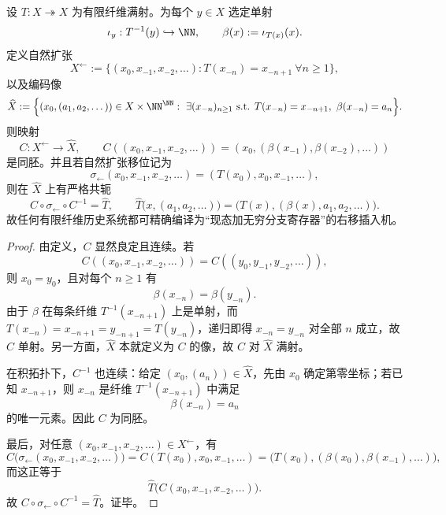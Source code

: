 \begin{theorem}[有限纤维自然扩张的右移插入实现]\label{thm:conclusion-finite-fiber-natural-extension-right-shift-insertion}
设 \(T:X\twoheadrightarrow X\) 为有限纤维满射。为每个 \(y\in X\) 选定单射
\[
\iota_y:T^{-1}(y)\hookrightarrow \NN,
\qquad
\beta(x):=\iota_{T(x)}(x).
\]
定义自然扩张
\[
X^{\leftarrow}
:=
\{(x_0,x_{-1},x_{-2},\dots): T(x_{-n})=x_{-n+1}\ \forall n\ge 1\},
\]
以及编码像
\[
\widehat X
:=
\Bigl\{(x_0,(a_1,a_2,\dots))\in X\times \NN^{\NN}:\ \exists (x_{-n})_{n\ge 1}
\text{ s.t. }T(x_{-n})=x_{-n+1},\ \beta(x_{-n})=a_n\Bigr\}.
\]
则映射
\[
C:X^{\leftarrow}\to \widehat X,
\qquad
C((x_0,x_{-1},x_{-2},\dots))=(x_0,(\beta(x_{-1}),\beta(x_{-2}),\dots))
\]
是同胚。并且若自然扩张移位记为
\[
\sigma_{\leftarrow}(x_0,x_{-1},x_{-2},\dots)=(T(x_0),x_0,x_{-1},\dots),
\]
则在 \(\widehat X\) 上有严格共轭
\[
C\circ \sigma_{\leftarrow}\circ C^{-1}
=
\widehat T,
\qquad
\widehat T\bigl(x,(a_1,a_2,\dots)\bigr)=\bigl(T(x),(\beta(x),a_1,a_2,\dots)\bigr).
\]
故任何有限纤维历史系统都可精确编译为“现态加无穷分支寄存器”的右移插入机。
\end{theorem}
\begin{proof}
由定义，\(C\) 显然良定且连续。若
\[
C((x_0,x_{-1},x_{-2},\dots))=C((y_0,y_{-1},y_{-2},\dots)),
\]
则 \(x_0=y_0\)，且对每个 \(n\ge 1\) 有
\[
\beta(x_{-n})=\beta(y_{-n}).
\]
由于 \(\beta\) 在每条纤维 \(T^{-1}(x_{-n+1})\) 上是单射，而 \(T(x_{-n})=x_{-n+1}=y_{-n+1}=T(y_{-n})\)，递归即得 \(x_{-n}=y_{-n}\) 对全部 \(n\) 成立，故 \(C\) 单射。另一方面，\(\widehat X\) 本就定义为 \(C\) 的像，故 \(C\) 对 \(\widehat X\) 满射。

在积拓扑下，\(C^{-1}\) 也连续：给定 \((x_0,(a_n))\in \widehat X\)，先由 \(x_0\) 确定第零坐标；若已知 \(x_{-n+1}\)，则 \(x_{-n}\) 是纤维 \(T^{-1}(x_{-n+1})\) 中满足
\[
\beta(x_{-n})=a_n
\]
的唯一元素。因此 \(C\) 为同胚。

最后，对任意 \((x_0,x_{-1},x_{-2},\dots)\in X^{\leftarrow}\)，有
\[
C\bigl(\sigma_{\leftarrow}(x_0,x_{-1},x_{-2},\dots)\bigr)
=
C(T(x_0),x_0,x_{-1},\dots)
=
\bigl(T(x_0),(\beta(x_0),\beta(x_{-1}),\dots)\bigr),
\]
而这正等于
\[
\widehat T\bigl(C(x_0,x_{-1},x_{-2},\dots)\bigr).
\]
故 \(C\circ \sigma_{\leftarrow}\circ C^{-1}=\widehat T\)。证毕。
\end{proof}

